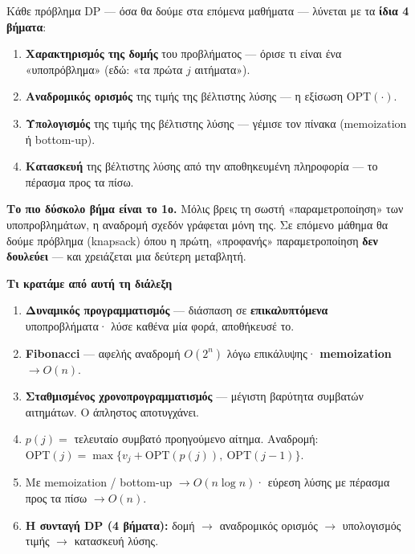 \documentclass[11pt,a4paper]{article}
\begin{document}
Κάθε πρόβλημα DP --- όσα θα δούμε στα επόμενα μαθήματα --- λύνεται με τα
\textbf{ίδια 4 βήματα}:

\begin{keypoint}
\begin{enumerate}
  \item \textbf{Χαρακτηρισμός της δομής} του προβλήματος --- όρισε τι είναι ένα
  «υποπρόβλημα» (εδώ: «τα πρώτα $j$ αιτήματα»).
  \item \textbf{Αναδρομικός ορισμός} της τιμής της βέλτιστης λύσης --- η εξίσωση
  $\text{OPT}(\cdot)$.
  \item \textbf{Υπολογισμός} της τιμής της βέλτιστης λύσης --- γέμισε τον πίνακα
  (memoization ή bottom-up).
  \item \textbf{Κατασκευή} της βέλτιστης λύσης από την αποθηκευμένη πληροφορία
  --- το πέρασμα προς τα πίσω.
\end{enumerate}
\end{keypoint}

\begin{intuition}
\textbf{Το πιο δύσκολο βήμα είναι το 1ο.} Μόλις βρεις τη σωστή
«παραμετροποίηση» των υποπροβλημάτων, η αναδρομή σχεδόν γράφεται μόνη της. Σε
επόμενο μάθημα θα δούμε πρόβλημα (knapsack) όπου η πρώτη, «προφανής»
παραμετροποίηση \textbf{δεν δουλεύει} --- και χρειάζεται μια δεύτερη μεταβλητή.
\end{intuition}

\begin{recapbox}
\textbf{Τι κρατάμε από αυτή τη διάλεξη}
\begin{enumerate}
  \item \textbf{Δυναμικός προγραμματισμός} --- διάσπαση σε \textbf{επικαλυπτόμενα}
  υποπροβλήματα· λύσε καθένα μία φορά, αποθήκευσέ το.
  \item \textbf{Fibonacci} --- αφελής αναδρομή $O(2^n)$ λόγω επικάλυψης·
  \textbf{memoization} $\to O(n)$.
  \item \textbf{Σταθμισμένος χρονοπρογραμματισμός} --- μέγιστη βαρύτητα συμβατών
  αιτημάτων. Ο άπληστος αποτυγχάνει.
  \item $p(j) = $ τελευταίο συμβατό προηγούμενο αίτημα. Αναδρομή:
  $\text{OPT}(j) = \max\{v_j + \text{OPT}(p(j)),\ \text{OPT}(j-1)\}$.
  \item Με memoization / bottom-up $\to O(n \log n)$· εύρεση λύσης με πέρασμα
  προς τα πίσω $\to O(n)$.
  \item \textbf{Η συνταγή DP (4 βήματα):} δομή $\to$ αναδρομικός ορισμός $\to$
  υπολογισμός τιμής $\to$ κατασκευή λύσης.
\end{enumerate}
\end{recapbox}

\lecturefooter
\end{document}

